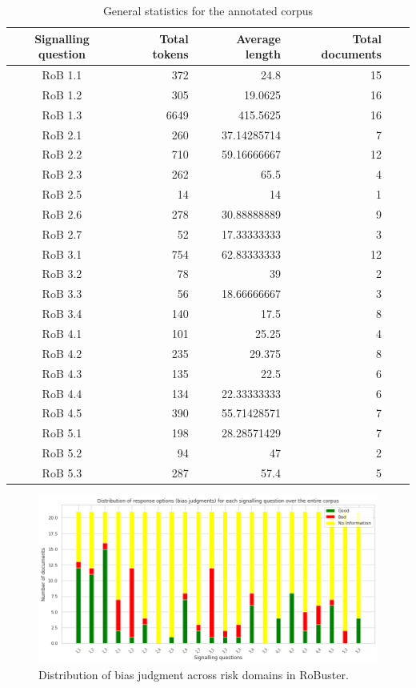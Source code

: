 \documentclass[sn-mathphys,Numbered]{sn-jnl}%
\theoremstyle{thmstyleone}%
\theoremstyle{thmstyletwo}%
\theoremstyle{thmstylethree}%
\begin{document}
%
%
%
\begin{table}[htb]
    \centering
    \caption{General statistics for the annotated corpus}
    \label{table:stats}
    \begin{tabular}{crrrrr}
    \hline
        Signalling question & Total tokens & Average length & Total documents \\ \hline
        RoB 1.1 & 372 & 24.8 & 15 \\ 
        RoB 1.2 & 305 & 19.0625 & 16 \\ 
        RoB 1.3 & 6649 & 415.5625 & 16 \\ 
        RoB 2.1 & 260 & 37.14285714 & 7 \\ 
        RoB 2.2 & 710 & 59.16666667 & 12 \\ 
        RoB 2.3 & 262 & 65.5 & 4 \\ 
        RoB 2.5 & 14 & 14 & 1 \\ 
        RoB 2.6 & 278 & 30.88888889 & 9 \\ 
        RoB 2.7 & 52 & 17.33333333 & 3 \\ 
        RoB 3.1 & 754 & 62.83333333 & 12 \\ 
        RoB 3.2 & 78 & 39 & 2 \\ 
        RoB 3.3 & 56 & 18.66666667 & 3 \\ 
        RoB 3.4 & 140 & 17.5 & 8 \\ 
        RoB 4.1 & 101 & 25.25 & 4 \\ 
        RoB 4.2 & 235 & 29.375 & 8 \\ 
        RoB 4.3 & 135 & 22.5 & 6 \\ 
        RoB 4.4 & 134 & 22.33333333 & 6 \\ 
        RoB 4.5 & 390 & 55.71428571 & 7 \\ 
        RoB 5.1 & 198 & 28.28571429 & 7 \\ 
        RoB 5.2 & 94 & 47 & 2 \\ 
        RoB 5.3 & 287 & 57.4 & 5 \\ \hline
    \end{tabular}
\end{table}
%
%
%

%
%
%
\begin{figure}[htb]
    \centering
    \includegraphics[width=0.90\columnwidth]{figures/judgment_dist.png}
    \caption{Distribution of bias judgment across risk domains in RoBuster.}
    \label{fig:rob_information}
\end{figure}
%
%
%
\end{document}
